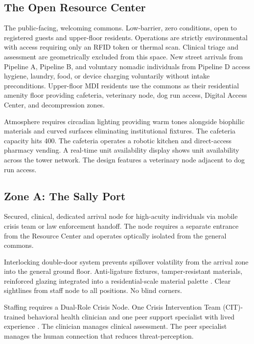 \documentclass[12pt, letterpaper]{article}
\begin{document}
\subsection{The Open Resource Center}

The public-facing, welcoming commons. Low-barrier, zero conditions, open to registered guests and upper-floor residents. Operations are strictly environmental with access requiring only an RFID token or thermal scan. Clinical triage and assessment are geometrically excluded from this space. New street arrivals from Pipeline A, Pipeline B, and voluntary nomadic individuals from Pipeline D access hygiene, laundry, food, or device charging voluntarily without intake preconditions. Upper-floor MDI residents use the commons as their residential amenity floor providing cafeteria, veterinary node, dog run access, Digital Access Center, and decompression zones.

Atmosphere requires circadian lighting providing warm tones alongside biophilic materials and curved surfaces eliminating institutional fixtures. The cafeteria capacity hits 400. The cafeteria operates a robotic kitchen and direct-access pharmacy vending. A real-time unit availability display shows unit availability across the tower network. The design features a veterinary node adjacent to dog run access.

\subsection{Zone A: The Sally Port}

Secured, clinical, dedicated arrival node for high-acuity individuals via mobile crisis team or law enforcement handoff. The node requires a separate entrance from the Resource Center and operates optically isolated from the general commons.

Interlocking double-door system prevents spillover volatility from the arrival zone into the general ground floor. Anti-ligature fixtures, tamper-resistant materials, reinforced glazing integrated into a residential-scale material palette \citep{empath_model_2020}. Clear sightlines from staff node to all positions. No blind corners.

Staffing requires a Dual-Role Crisis Node. One Crisis Intervention Team (CIT)-trained behavioral health clinician and one peer support specialist with lived experience \citep{cit_memphis_model_2023}. The clinician manages clinical assessment. The peer specialist manages the human connection that reduces threat-perception.
\end{document}

